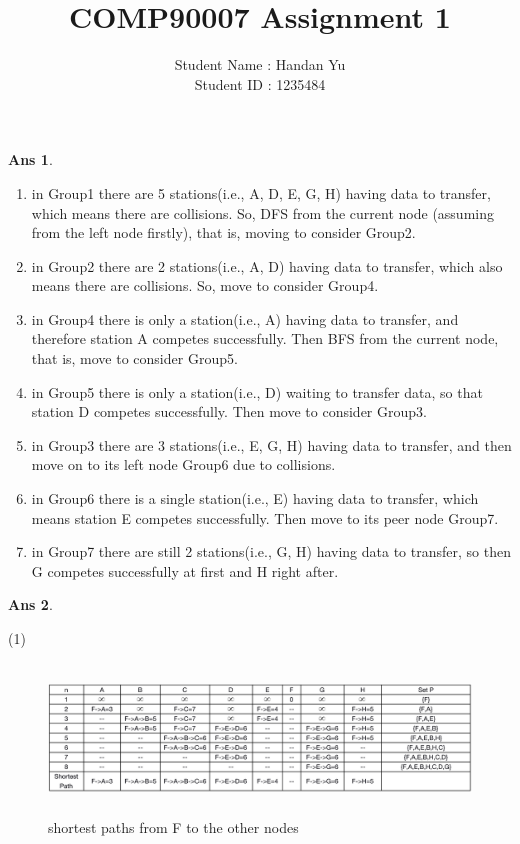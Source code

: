 \documentclass[11pt]{article} %
\title{COMP90007 Assignment 1}  %
\author{Student Name : Handan Yu\\ Student ID : 1235484}
\newtheorem{Q}{Ans}
\begin{document}
\date{}
\maketitle 
 \begin{Q}
 \end{Q}
\begin{enumerate}[Slot1.]
\item  in Group1 there are 5 stations(i.e., A, D, E, G, H) having data to transfer, which means there are collisions. So, DFS from the current node (assuming from the left 
node firstly), that is, moving to consider Group2.
\item  in Group2 there are  2 stations(i.e., A, D) having data to transfer, which also means there are collisions. So, move to consider Group4.
\item  in Group4 there is only a station(i.e., A) having data to transfer, and therefore station A competes successfully. Then BFS from the current node, that is, move to consider Group5.
\item  in Group5 there is only a station(i.e., D) waiting to transfer data, so that station D competes successfully. Then move to consider Group3.
\item  in Group3 there are 3 stations(i.e., E, G, H) having data to transfer, and then move on to its left node Group6 due to collisions.
\item  in Group6 there is a single station(i.e., E) having data to transfer, which means station E competes successfully. Then move to its peer node Group7.
\item  in Group7 there are still 2 stations(i.e., G, H) having data to transfer, so then G competes successfully at first and H right after.
\end{enumerate}
 \begin{Q}
 \end{Q}
(1)
 \begin{figure}[htbp]
 \centering
\includegraphics[height=4cm,width=15cm]{img/shortestpath1.png}
\caption{shortest paths from F to the other nodes }
 \end{figure}
 
\end{document}
